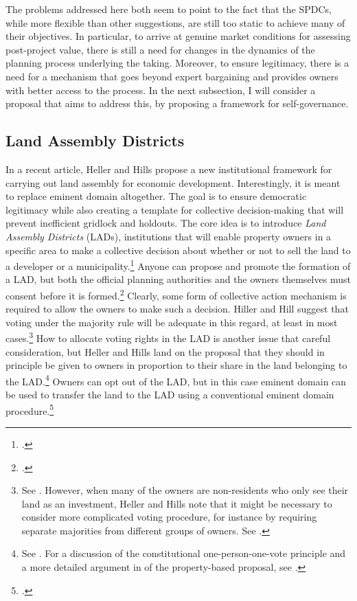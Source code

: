 The problems addressed here both seem to point to the fact that the SPDCs, while more flexible than other suggestions, are still too static to achieve many of their objectives. In particular, to arrive at genuine market conditions for assessing post-project value, there is still a need for changes in the dynamics of the planning process underlying the taking. Moreover, to ensure legitimacy, there is a need for a mechanism that goes beyond expert bargaining and provides owners with better access to the  process. In the next subsection, I will consider a proposal that aims to address this, by proposing a framework for self-governance. 

\subsection{Land Assembly Districts}

In a recent article, Heller and Hills propose a new institutional framework for carrying out land assembly for economic development. Interestingly, it is meant to replace eminent domain altogether. The goal is to ensure democratic legitimacy while also creating a template for collective decision-making that will prevent inefficient gridlock and holdouts. The core idea is to introduce {\it Land Assembly Districts} (LADs), institutions that will enable property owners in a specific area to make a collective decision about whether or not to sell the land to a developer or a municipality.\footcite[1469-1470]{heller08} Anyone can propose and promote the formation of a LAD, but both the official planning authorities and the owners themselves must consent before it is formed.\footcite[1488-1489]{heller08} Clearly, some form of collective action mechanism is required to allow the owners to make such a decision. Hiller and Hill suggest that voting under the majority rule will be adequate in this regard, at least in most cases.\footnote{See \cite[1496]{heller08}. However, when many of the owners are non-residents who only see their land as an investment, Heller and Hills note that it might be necessary to consider more complicated voting procedure, for instance by requiring separate majorities from different groups of owners. See \cite[1523-1524]{heller08}.} How to allocate voting rights in the LAD is another issue that  careful consideration, but Heller and Hills land on the proposal that they should in principle be given to owners in proportion to their share in the land belonging to the LAD.\footnote{See \cite[1492]{heller08}. For a discussion of the constitutional one-person-one-vote principle and a more detailed argument in  of the property-based proposal, see \cite[1503-1507]{heller08}.} Owners can opt out of the LAD, but in this case eminent domain can be used to transfer the land to the LAD using a conventional eminent domain procedure.\footcite[1496]{heller08}

